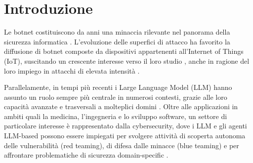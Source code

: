 \chapter{Introduzione} %

Le botnet costituiscono da anni una minaccia rilevante nel panorama della sicurezza informatica \cite{silva2013botnets}. L'evoluzione delle superfici di attacco ha favorito la diffusione di botnet composte da dispositivi appartenenti all'Internet of Things (IoT), suscitando un crescente interesse verso il loro studio \cite{lefoane2025iot}, anche in ragione del loro impiego in attacchi di elevata intensità \cite{nokia2025ddos}.





Parallelamente, in tempi più recenti i Large Language Model (LLM) hanno assunto un ruolo sempre più centrale in numerosi contesti, grazie alle loro capacità avanzate e trasversali a molteplici domini \cite{li2024fundamental}. Oltre alle applicazioni in ambiti quali la medicina, l'ingegneria e lo sviluppo software, un settore di particolare interesse è rappresentato dalla cybersecurity, dove i LLM e gli agenti LLM-based possono essere impiegati per svolgere attività di scoperta autonoma delle vulnerabilità (red teaming), di difesa dalle minacce (blue teaming) e per affrontare problematiche di sicurezza domain-specific \cite{agentic2025security}.


